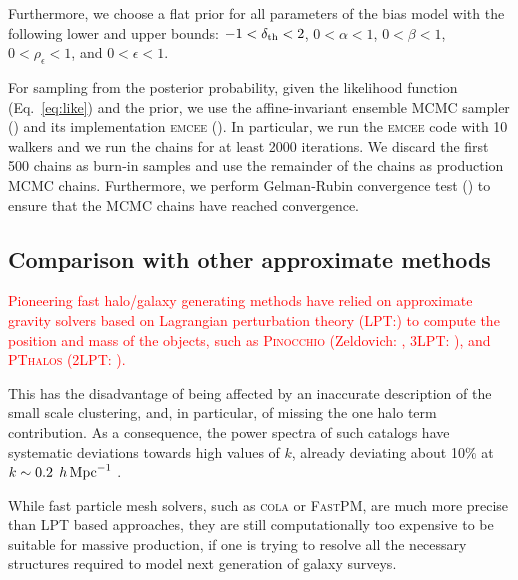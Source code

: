 \documentclass[english,usenatbib]{mn2e}
\newcommand{\tod}[1]{{\textcolor{red}{ #1}}}
\newcommand{\hperm}{\,h\,{\rm Mpc}^{-1}}
\begin{document}
Furthermore, we choose a flat prior for all parameters of the bias model with the following lower and upper bounds: $-1<\delta_{\rm th}<2$, $0<\alpha<1$, $0<\beta<1$, $0<\rho_{\epsilon}<1$, and $0<\epsilon<1$.

For sampling from the posterior probability, given the likelihood function (Eq.~\ref{eq:like}) and the prior, we use the affine-invariant ensemble MCMC sampler (\citealt{goodmanweare}) and its implementation \textsc{emcee} (\citealt{emcee}). In particular, we run the \textsc{emcee} code with 10 walkers and we run the chains for at least 2000 iterations. We discard the first 500 chains as burn-in samples and use the remainder of the chains as production MCMC chains. Furthermore, we perform Gelman-Rubin convergence test (\citealt{grtest}) to ensure that the MCMC chains have reached convergence.

\subsection{Comparison with other approximate methods}

\tod{Pioneering fast halo/galaxy generating methods have relied on approximate gravity solvers based on Lagrangian perturbation theory (LPT:\citealt{buchert1993,bouchet1995,catelan1995,scocci2002}) to compute the position and mass of the objects, such as \textsc{Pinocchio} (Zeldovich: \citealt{monaco2002,monaco2013}, 3LPT: \citealt{monaco2016}), and \textsc{PThalos} (2LPT: \citealt{pthalo,manera2015}).}

This has the disadvantage of being affected by an inaccurate description of the small scale clustering, and, in particular, of missing the one halo term contribution. As a consequence, the power spectra of such catalogs have systematic deviations towards high values of $k$, already deviating about 10$\%$ at $k\sim0.2\; \hperm$ \citep[][]{monaco2013}.

While fast particle mesh solvers, such as \textsc{cola} or \textsc{FastPM}, are much more precise than LPT based approaches, they are  still computationally too expensive to be suitable for massive production, if one is trying to resolve all the necessary structures required to model next generation of galaxy surveys.

\end{document}

